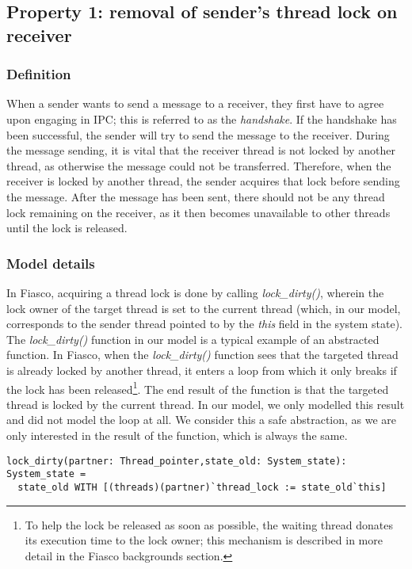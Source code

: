 \subsection{Property 1: removal of sender's thread lock on receiver}

\subsubsection{Definition}
When a sender wants to send a message to a receiver, they first have to agree upon engaging in IPC; this is referred to as the \emph{handshake}. If the handshake has been successful, the sender will try to send the message to the receiver. During the message sending, it is vital that the receiver thread is not locked by another thread, as otherwise the message could not be transferred. Therefore, when the receiver is locked by another thread, the sender acquires that lock before sending the message. After the message has been sent, there should not be any thread lock remaining on the receiver, as it then becomes unavailable to other threads until the lock is released.

\subsubsection{Model details}
In Fiasco, acquiring a thread lock is done by calling \emph{lock\_dirty()}, wherein the lock owner of the target thread is set to the current thread (which, in our model, corresponds to the sender thread pointed to by the \emph{this} field in the system state). The \emph{lock\_dirty()} function in our model is a typical example of an abstracted function. In Fiasco, when the \emph{lock\_dirty()} function sees that the targeted thread is already locked by another thread, it enters a loop from which it only breaks if the lock has been released\footnote{To help the lock be released as soon as possible, the waiting thread donates its execution time to the lock owner; this mechanism is described in more detail in the Fiasco backgrounds section.}. The end result of the function is that the targeted thread is locked by the current thread. In our model, we only modelled this result and did not model the loop at all. We consider this a safe abstraction, as we are only interested in the result of the function, which is always the same.

\lstset{language=PVS}
\begin{lstlisting}[caption={PVS: \emph{lock\_dirty()} function.}]
% Set the thread lock of the partner thread to the <this> thread.
lock_dirty(partner: Thread_pointer,state_old: System_state): System_state =
  state_old WITH [(threads)(partner)`thread_lock := state_old`this]
\end{lstlisting}

